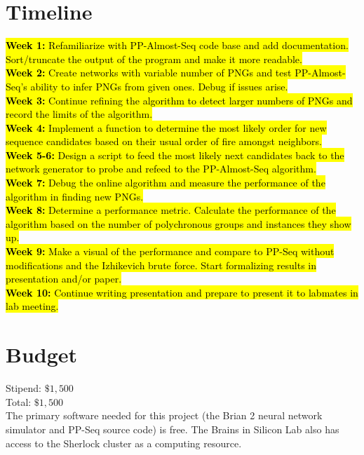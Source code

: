 \documentclass{sigchi}
\begin{document}
\section{Timeline}
\hl{
\textbf{Week 1:} Refamiliarize with PP-Almost-Seq code base and add documentation. Sort/truncate the output of the program and make it more readable. \\
\textbf{Week 2:} Create networks with variable number of PNGs and test PP-Almost-Seq's ability to infer PNGs from given ones. Debug if issues arise.\\
\textbf{Week 3:} Continue refining the algorithm to detect larger numbers of PNGs and record the limits of the algorithm.\\
\textbf{Week 4:} Implement a function to determine the most likely order for new sequence candidates based on their usual order of fire amongst neighbors.\\
\textbf{Week 5-6:} Design a script to feed the most likely next candidates back to the network generator to probe and refeed to the PP-Almost-Seq algorithm.\\
\textbf{Week 7:} Debug the online algorithm and measure the performance of the algorithm in finding new PNGs.\\
\textbf{Week 8:} Determine a performance metric. Calculate the performance of the algorithm based on the number of polychronous groups and instances they show up.\\
\textbf{Week 9:} Make a visual of the performance and compare to PP-Seq without modifications and the Izhikevich brute force. Start formalizing results in presentation and/or paper.\\
\textbf{Week 10:} Continue writing presentation and prepare to present it to labmates in lab meeting.
}
\section{Budget}
Stipend: $\$1,500$\\
Total: $\$1,500$\\
The primary software needed for this project (the Brian 2 neural network simulator and PP-Seq source code) is free. The Brains in Silicon Lab also has access to the Sherlock cluster as a computing resource.\\ 

\balance{}

{} %
\end{document}
